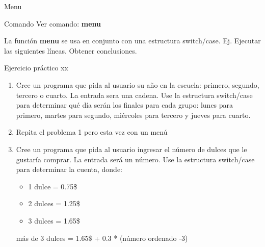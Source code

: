 \documentclass{bredelebeamer}
\begin{document}
\begin{frame}{Menu}
\begin{exampleblock}{Comando}
Ver comando: \textbf{menu}
\end{exampleblock}
La función \textbf{menu} se usa en conjunto con una estructura switch/case.
Ej. Ejecutar las siguientes líneas. Obtener conclusiones.
\end{frame}

\begin{frame}{Ejercicio práctico xx}
\begin{enumerate}
\item Cree un programa que pida al usuario su año en la escuela: primero, segundo, tercero o cuarto. La entrada sera una cadena. Use la estructura switch/case para determinar qué día serán los finales para cada grupo: lunes para primero, martes para segundo, miércoles para tercero y jueves para cuarto.
\item Repita el problema 1 pero esta vez con un menú
\item Cree un programa que pida al usuario ingresar el número de dulces que le gustaría comprar. La entrada será un número. Use la estructura switch/case para determinar la cuenta, donde:
\begin{itemize}
\item 1 dulce = 0.75\$
\item 2 dulces = 1.25\$
\item 3 dulces = 1.65\$
\end{itemize}
más de 3 dulces = 1.65\$ + 0.3 * (número ordenado -3)
\end{enumerate}
\end{frame}
\end{document}
